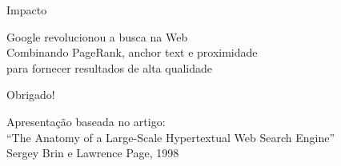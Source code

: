 \documentclass{beamer}
\begin{document}
\begin{frame}{Impacto}
    \begin{center}
        \Large
        Google revolucionou a busca na Web\\
        \vspace{1cm}
        \normalsize
        Combinando PageRank, anchor text e proximidade\\
        para fornecer resultados de alta qualidade
    \end{center}
\end{frame}

\begin{frame}
    \begin{center}
        \Huge Obrigado!
        \vspace{1cm}
        
        \normalsize
        Apresentação baseada no artigo:\\
        ``The Anatomy of a Large-Scale Hypertextual Web Search Engine''\\
        Sergey Brin e Lawrence Page, 1998
    \end{center}
\end{frame}
\end{document}
